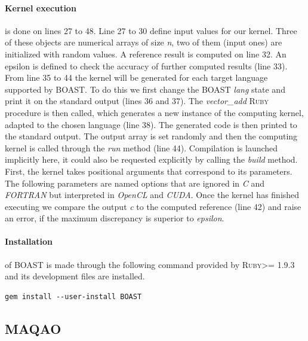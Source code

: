 \documentclass[11pt, a4paper, twoside]{montblanc2}
\def\ruby{\textsc{Ruby}\xspace}
\begin{document}
\paragraph{Kernel execution} is done on lines 27 to 48.
Line 27 to 30 define input values for our kernel.
Three of these objects are numerical arrays of size \emph{n}, two of them (input ones) are initialized with random values.
A reference result is computed on line 32.
An epsilon is defined to check the accuracy of further computed results (line 33).
From line 35 to 44 the kernel will be generated for each target language supported by BOAST.
To do this we first change the BOAST \emph{lang} state and print it on the standard output (lines 36 and 37).
The \emph{vector\_add} \ruby procedure is then called, which generates a new instance of the computing kernel, adapted to the chosen language (line 38).
The generated code is then printed to the standard output.
The output array is set randomly and then the computing kernel is called through the \emph{run} method  (line 44).
Compilation is launched implicitly here, it could also be requested explicitly by calling the \emph{build} method.
First, the kernel takes positional arguments that correspond to its parameters.
The following parameters are named options that are ignored in \emph{C} and \emph{FORTRAN} but interpreted in \emph{OpenCL} and \emph{CUDA}.
Once the kernel has finished executing we compare the output \emph{c} to the computed reference 
(line 42) and raise an error, if the maximum discrepancy is superior to \emph{epsilon}.

\paragraph{Installation} of BOAST is made through the following command provided by \ruby >= 1.9.3 and its development files are installed.

\lstset{style=Bash}
\begin{lstlisting}
gem install --user-install BOAST
\end{lstlisting}

\subsection{MAQAO}
\end{document}
